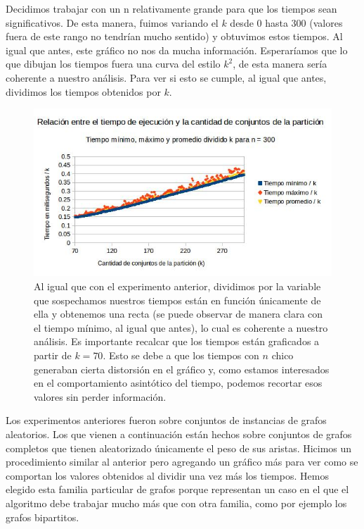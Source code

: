 \documentclass[a4paper]{article}
\begin{document}
Decidimos trabajar con un n relativamente grande para que los tiempos sean significativos. De esta manera, fuimos variando el $k$ desde 0 hasta 300 (valores fuera de este rango no tendrían mucho sentido) y obtuvimos estos tiempos. Al igual que antes, este gráfico no nos da mucha información. Esperaríamos que lo que dibujan los tiempos fuera una curva del estilo $k^2$, de esta manera sería coherente a nuestro análisis. Para ver si esto se cumple, al igual que antes, dividimos los tiempos obtenidos por $k$.

\begin{figure}[h!]
\centering
\includegraphics[scale=0.7]{graficostiempohgolosa/tiemponfijo2.jpg}\caption{Al igual que con el experimento anterior, dividimos por la variable que sospechamos nuestros tiempos están en función únicamente de ella y obtenemos una recta (se puede observar de manera clara con el tiempo mínimo, al igual que antes), lo cual es coherente a nuestro análisis. Es importante recalcar que los tiempos están graficados a partir de $k = 70$. Esto se debe a que los tiempos con $n$ chico generaban cierta distorsión en el gráfico y, como estamos interesados en el comportamiento asintótico del tiempo, podemos recortar esos valores sin perder información.}
\end{figure}
Los experimentos anteriores fueron sobre conjuntos de instancias de grafos aleatorios. Los que vienen a continuación están hechos sobre conjuntos de grafos completos que tienen aleatorizado únicamente el peso de sus aristas.
\newline Hicimos un procedimiento similar al anterior pero agregando un gráfico más para ver como se comportan los valores obtenidos al dividir una vez más los tiempos.
\newline Hemos elegido esta familia particular de grafos porque representan un caso en el que el algoritmo debe trabajar mucho más que con otra familia, como por ejemplo los grafos bipartitos.
\end{document}
